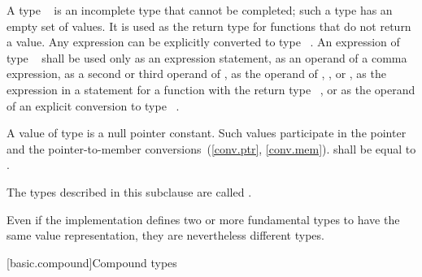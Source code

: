 \pnum
{}%
A type \cv{}~
is an incomplete type that cannot be completed; such a type has
an empty set of values. It is used as the return
type for functions that do not return a value. Any expression can be
explicitly converted to type \cv{}~.
An expression of type \cv{}~ shall
be used only as an expression statement, as an operand
of a comma expression, as a second or third operand
of , as the operand of
, , or , as
the expression in a  statement for a function
with the return type \cv{}~, or as the operand of an explicit conversion
to type \cv{}~.

\pnum
A value of type  is a null pointer
constant. Such values participate in the pointer and the
pointer-to-member conversions~(\ref{conv.ptr}, \ref{conv.mem}).
 shall be equal to .

\pnum
{}%
The types described in this subclause
are called .
\begin{note}
Even if the implementation defines two or more fundamental types to have the
same value representation, they are nevertheless different types.
\end{note}

[basic.compound]{Compound types}

